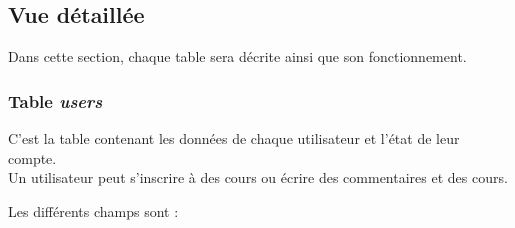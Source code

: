 \newpage


\subsection{Vue détaillée}
\label{sec:vue-details}
Dans cette section, chaque table sera décrite ainsi que son fonctionnement.


\subsubsection{Table \textit{users}}
\label{sec:table-users}
C'est la table contenant les données de chaque utilisateur et l'état de leur compte.\\
Un utilisateur peut s'inscrire à des cours ou écrire des commentaires et des cours.

Les différents champs sont :

